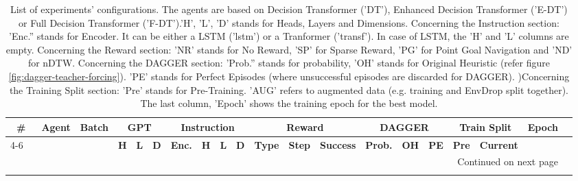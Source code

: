 \begin{longtable}{@{\hskip3pt}c@{\hskip3pt}c@{\hskip3pt}c@{\hskip3pt}c@{\hskip3pt}c@{\hskip3pt}c@{\hskip3pt}c@{\hskip3pt}c@{\hskip3pt}c@{\hskip3pt}c@{\hskip3pt}c@{\hskip3pt}c@{\hskip3pt}c@{\hskip3pt}c@{\hskip3pt}c@{\hskip3pt}c@{\hskip3pt}c@{\hskip3pt}c@{\hskip3pt}c@{\hskip3pt}c}
\caption{List of experiments' configurations. \newline The agents are based on Decision Transformer ('DT'), Enhanced Decision Transformer ('E-DT') or Full Decision Transformer ('F-DT').\newline 'H', 'L', 'D' stands for Heads, Layers and Dimensions. \newline Concerning the Instruction section: 'Enc.'' stands for Encoder. It can be either a LSTM ('lstm') or a Tranformer ('transf'). In case of LSTM, the 'H' and 'L' columns are empty. \newline Concerning the Reward section: ’NR’ stands for No Reward, ’SP’ for Sparse Reward, ’PG’ for Point Goal Navigation and ’ND’ for nDTW.  \newline Concerning the DAGGER section: 'Prob.'' stands for probability, 'OH' stands for Original Heuristic (refer figure \ref{fig:dagger-teacher-forcing}). 'PE' stands for Perfect Episodes (where unsuccessful episodes are discarded for DAGGER). )\newline Concerning the Training Split section: 'Pre' stands for Pre-Training. 'AUG' refers to augmented data (e.g. training and EnvDrop split together). The last column, 'Epoch' shows the training epoch for the best model.}\\
\toprule
\textbf{\#} & \textbf{Agent} & \textbf{Batch} & \multicolumn{3}{c}{\textbf{GPT}} & \multicolumn{4}{c}{\textbf{Instruction}} & \multicolumn{3}{c}{\textbf{Reward}} & \multicolumn{3}{c}{\textbf{DAGGER}} & \multicolumn{2}{c}{\textbf{Train Split}} & \textbf{Epoch} \\
 \cmidrule(l){4-6} \textbf{~} &     \textbf{~} &     \textbf{~} &   \textbf{H} & \textbf{L} & \textbf{D} &        \textbf{Enc.} & \textbf{H} & \textbf{L} & \textbf{D} &   \textbf{Type} & \textbf{Step} & \textbf{Success} &  \textbf{Prob.} & \textbf{OH} & \textbf{PE} &         \textbf{Pre} & \textbf{Current} &     \textbf{~} \\
\midrule
\endhead
\midrule
\multicolumn{19}{r}{{Continued on next page}} \\
\midrule
\endfoot


\end{longtable}
